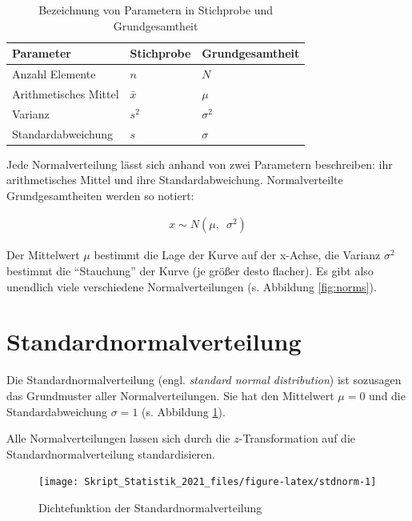 \documentclass[
  11pt,
  ngerman,
  a4paper,
]{report}
\begin{document}
\begin{table}

\caption{\label{tab:param}Bezeichnung von Parametern in Stichprobe und Grundgesamtheit}
\centering
\begin{tabular}[t]{lll}
\toprule
Parameter & Stichprobe & Grundgesamtheit\\
\midrule
Anzahl Elemente & $n$ & $N$\\
Arithmetisches Mittel & $\bar{x}$ & $\mu$\\
Varianz & $s^2$ & $\sigma^2$\\
Standardabweichung & $s$ & $\sigma$\\
\bottomrule
\end{tabular}
\end{table}

Jede Normalverteilung lässt sich anhand von zwei Parametern beschreiben: ihr arithmetisches Mittel und ihre Standardabweichung. Normalverteilte Grundgesamtheiten werden so notiert:

\nopagebreak

\[\begin{aligned}
x \sim N(\mu,\enspace\sigma^2)
\end{aligned}
\label{eq:norm}\]

Der Mittelwert \(\mu\) bestimmt die Lage der Kurve auf der x-Achse, die Varianz \(\sigma^2\) bestimmt die \enquote{Stauchung} der Kurve (je größer desto flacher). Es gibt also unendlich viele verschiedene Normalverteilungen (s. Abbildung \ref{fig:norms}).

\hypertarget{standardnormalverteilung}{%
\section{Standardnormalverteilung}\label{standardnormalverteilung}}

Die Standardnormalverteilung (engl. \emph{standard normal distribution}) ist sozusagen das Grundmuster aller Normalverteilungen. Sie hat den Mittelwert \(\mu=0\) und die Standardabweichung \(\sigma=1\) (s. Abbildung \ref{fig:stdnorm}).

Alle Normalverteilungen lassen sich durch die \(z\)-Transformation auf die Standardnormalverteilung standardisieren.

\begin{figure}[!h]

{\centering \texttt{[image: Skript\_Statistik\_2021\_files/figure-latex/stdnorm-1]} 

}

\caption{Dichtefunktion der Standardnormalverteilung}\label{fig:stdnorm}
\end{figure}
\end{document}

